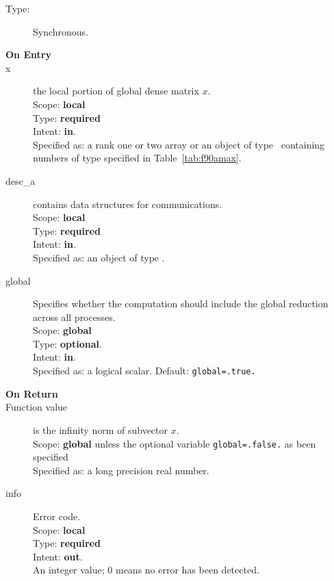\begin{description}
\item[Type:] Synchronous.
\item[\bf On Entry]
\item[x] the local portion of global dense matrix
$x$. %
\\
Scope: {\bf local} \\
Type: {\bf required} \\
Intent: {\bf in}.\\
Specified as:  a rank one or two array or an object of type \vdata\  
containing numbers of type specified in
Table~\ref{tab:f90amax}.
\item[desc\_a] contains data structures for communications.\\
Scope: {\bf local} \\
Type: {\bf required}\\
Intent: {\bf in}.\\
Specified as: an object of type \descdata.
\item[global]  Specifies whether the computation should include the
  global reduction across all processes.\\
Scope: {\bf global} \\
Type: {\bf optional}.\\
Intent: {\bf in}.\\
Specified as: a logical scalar.
Default: \verb|global=.true.|\\%

\item[\bf On Return] 
\item[Function value] is the infinity norm of subvector $x$.\\
Scope: {\bf global} unless the optional variable
\verb|global=.false.| as been specified\\
Specified as: a long precision real number.
\item[info] Error code.\\
Scope: {\bf local} \\
Type: {\bf required} \\
Intent: {\bf out}.\\
An integer value; 0 means no error has been detected. 
\end{description}

